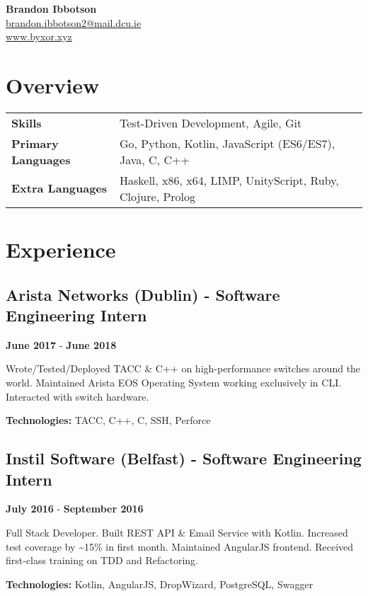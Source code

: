 \documentclass{article}
\newcommand{\youremail}[1]{\href{mailto:#1}{#1}}
\newcommand{\yourtitle}[3]{
  \begin{center}
    {\huge\bfseries #1}\\
    \vspace{.5em}
    \youremail{#2}\\
    \url{#3}\\
    \vspace{.7em}
  \end{center}
}
\begin{document}
\yourtitle{Brandon Ibbotson}{brandon.ibbotson2@mail.dcu.ie}{www.byxor.xyz}
\section{Overview}
\begin{tabularx}{\textwidth}{ll}
\vspace{1em}
\textbf{Skills} & Test-Driven Development, Agile, Git\\
\vspace{1em}
\textbf{Primary Languages} & Go, Python, Kotlin, JavaScript (ES6/ES7), Java, C, C++\\
\textbf{Extra Languages} & Haskell, x86, x64, LIMP, UnityScript, Ruby, Clojure, Prolog\\
\end{tabularx}
\section{Experience}
\subsection{Arista Networks (Dublin) - Software Engineering Intern}
\textbf{June 2017} - \textbf{June 2018}

Wrote/Tested/Deployed TACC \& C++ on high-performance switches around the world. Maintained Arista EOS Operating System working exclusively in CLI. Interacted with switch hardware.

\textbf{Technologies: }TACC, C++, C, SSH, Perforce
\vspace{0.5em}\subsection{Instil Software (Belfast) - Software Engineering Intern}
\textbf{July 2016} - \textbf{September 2016}

Full Stack Developer. Built REST API \& Email Service with Kotlin. Increased test coverage by \textasciitilde{}15\% in first month. Maintained AngularJS frontend. Received first-class training on TDD and Refactoring.

\textbf{Technologies: }Kotlin, AngularJS, DropWizard, PostgreSQL, Swagger
\vspace{0.5em}
\end{document}
